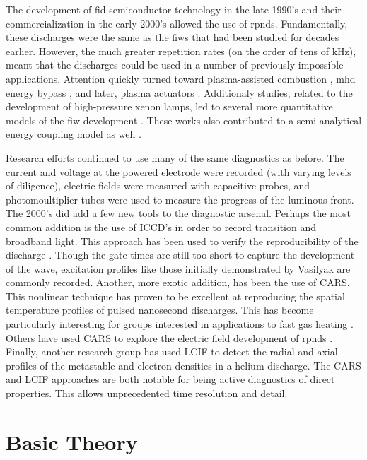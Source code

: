 The development of fid semiconductor technology in the late 1990's and
their commercialization in the early 2000's allowed the use of rpnds.
Fundamentally, these discharges were the same as the fiws that had been
studied for decades earlier. However, the much greater repetition rates
(on the order of tens of kHz), meant that the discharges could be used
in a number of previously impossible applications. Attention quickly
turned toward plasma-assisted combustion \cite{Starikoskaia2006}, mhd
energy bypass \cite{Macheret2002}, and later, plasma actuators
\cite{Adamovich2009}. Additionaly studies, related to the development of
high-pressure xenon lamps, led to several more quantitative models of
the fiw development \cite{Nikandrov2008, Tsendin2009}. These works also
contributed to a semi-analytical energy coupling model as well
\cite{Adamovich2009}.

Research efforts continued to use many of the same diagnostics as
before. The current and voltage at the powered electrode were recorded
(with varying levels of diligence), electric fields were measured with
capacitive probes, and photomoultiplier tubes were used to measure the
progress of the luminous front. The 2000's did add a few new tools to
the diagnostic arsenal. Perhaps the most common addition is the use of
ICCD's in order to record transition and broadband light. This approach
has been used to verify the reproducibility of the discharge
\cite{Adamovich2009}. Though the gate times are still too short to
capture the development of the wave, excitation profiles like those
initially demonstrated by Vasilyak\cite{Vasilyak1994} are commonly
recorded. Another, more exotic addition, has been the use of CARS. This
nonlinear technique has proven to be excellent at reproducing the
spatial temperature profiles of pulsed nanosecond discharges. This has
become particularly interesting for groups interested in applications to
fast gas heating \cite{Zuzeek2010}. Others have used CARS to explore the
electric field development of rpnds \cite{Ito2011, Mueller2010}.
Finally, another research group has used LCIF to detect the radial and
axial profiles of the metastable and electron densities in a helium
discharge. The CARS and LCIF approaches are both notable for being
active diagnostics of direct properties. This allows unprecedented time
resolution and detail.



\section{Basic Theory}

